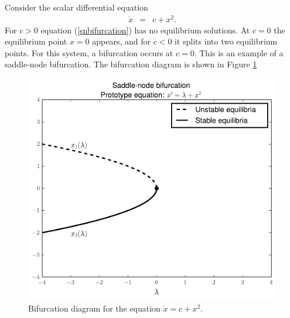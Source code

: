 

% 
Consider the scalar differential equation 
\begin{eqnarray}
\dot{x} &=& c + x^2. \label{snbifurcation}
\end{eqnarray}
For $c>0$ equation (\ref{snbifurcation}) has no equilibrium solutions. At $c=0$ the equilibrium point $x=0$ appears, and for $c<0$ it splits into two equilibrium points. For this system, a bifurcation occurs at $c=0$. This is an example of a saddle-node bifurcation. The bifurcation diagram is shown in Figure \ref{bifurcation:sn} 


\begin{figure}[ht]
\centering
\includegraphics[width=\textwidth]{SaddleNBifurcation.pdf}
\caption{Bifurcation diagram for the equation $\dot{x} = c + x^2$.}
\label{bifurcation:sn}
\end{figure}

